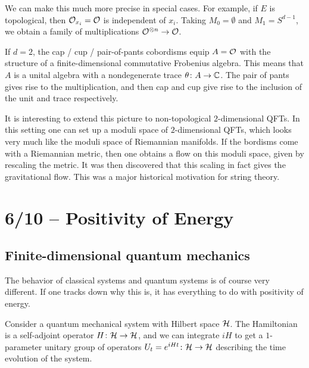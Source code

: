 We can make this much more precise in special cases.
For example, if $E$ is topological, then $\mathcal{O}_{x_i} = \mathcal{O}$ is independent of $x_i$.
Taking $M_0 = \emptyset$ and $M_1 = S^{d-1}$, we obtain a family of multiplications
$\mathcal{O}^{\otimes n} \to \mathcal{O}$.

\begin{ex}
If $d = 2$, the cap / cup / pair-of-pants cobordisms equip $A = \mathcal{O}$ with the structure of
a finite-dimensional commutative Frobenius algebra.
This means that $A$ is a unital algebra with a nondegenerate trace $\theta \colon A \to \mathbb{C}$.
The pair of pants gives rise to the multiplication, and then 
cap and cup give rise to the inclusion of the unit and trace respectively.
\end{ex}

It is interesting to extend this picture to non-topological $2$-dimensional QFTs.
In this setting one can set up a moduli space of $2$-dimensional QFTs, which looks very
much like the moduli space of Riemannian manifolds.
If the bordisms come with a Riemannian metric, then one obtains a flow on this moduli
space, given by rescaling the metric. 
It was then discovered that this scaling in fact gives the gravitational flow.
This was a major historical motivation for string theory.


\section{6/10 -- Positivity of Energy}

\subsection{Finite-dimensional quantum mechanics}

The behavior of classical systems and quantum systems is of course very different.
If one tracks down why this is, it has everything to do with positivity of energy.

Consider a quantum mechanical system with Hilbert space $\mathcal{H}$.
The Hamiltonian is a self-adjoint operator $H \colon \mathcal{H} \to \mathcal{H}$, and we can integrate $iH$ to
get a $1$-parameter unitary group of 
operators $U_t = e^{i H t} \colon \mathcal{H} \to \mathcal{H}$ describing the time evolution of the system.

